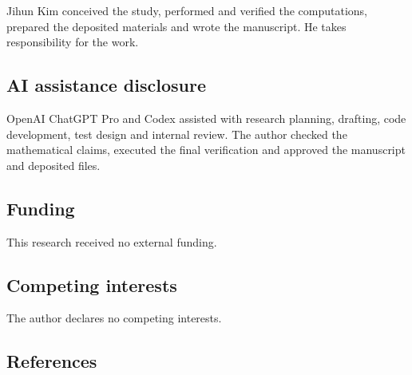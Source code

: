 \documentclass[
  english,
  11pt,
  a4paper,
]{article}
\begin{document}
Jihun Kim conceived the study, performed and verified the computations,
prepared the deposited materials and wrote the manuscript. He takes
responsibility for the work.

\subsection{AI assistance disclosure}\label{ai-assistance-disclosure}

OpenAI ChatGPT Pro and Codex assisted with research planning, drafting,
code development, test design and internal review. The author checked
the mathematical claims, executed the final verification and approved
the manuscript and deposited files.

\subsection{Funding}\label{funding}

This research received no external funding.

\subsection{Competing interests}\label{competing-interests}

The author declares no competing interests.

\subsection{References}\label{references}

\begingroup\small
\end{document}
